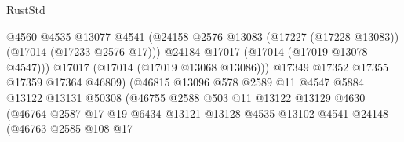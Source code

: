 \begin{lexlean}{RustStd}
\begin{coremodule}
                                            @4560
                                            @4535
                                            @13077
                                            @4541
                                            (@24158
                                              @2576
                                              @13083
                                              (@17227 (@17228 @13083))
                                              (@17014 (@17233 @2576 @17)))
                                            @24184
                                            @17017
                                            (@17014 (@17019 @13078 @4547)))
                                          @17017
                                          (@17014 (@17019 @13068 @13086)))
                                        @17349
                                        @17352
                                        @17355
                                        @17359
                                        @17364
                                        @46809)
                                      (@46815
                                        @13096
                                        @578
                                        @2589
                                        @11
                                        @4547
                                        @5884
                                        @13122
                                        @13131
                                        @50308
                                        (@46755
                                          @2588
                                          @503
                                          @11
                                          @13122
                                          @13129
                                          @4630
                                          (@46764
                                            @2587
                                            @17
                                            @19
                                            @6434
                                            @13121
                                            @13128
                                            @4535
                                            @13102
                                            @4541
                                            @24148
                                            (@46763
                                              @2585
                                              @108
                                              @17

\end{coremodule}
\end{lexlean}

